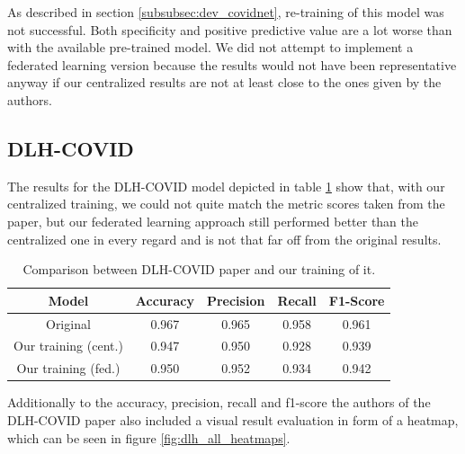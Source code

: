 As described in section \ref{subsubsec:dev_covidnet}, re-training of this model was not successful. Both specificity and positive predictive value are a lot worse than with the available pre-trained model. We did not attempt to implement a federated learning version because the results would not have been representative anyway if our centralized results are not at least close to the ones given by the authors.

\subsection{DLH-COVID}
The results for the DLH-COVID model depicted in table \ref{tab:results_dlh_covid} show that, with our centralized training, we could not quite match the metric scores taken from the paper, but our federated learning approach still performed better than the centralized one in every regard and is not that far off from the original results.

\begin{table}[htbp]
    \small
    \centering
    \caption{Comparison between DLH-COVID paper\cite{dlh_net} and our training of it.}
    \begin{tabular}{c|c|c|c|c}
        Model & Accuracy & Precision & Recall & F1-Score \\
        \hline
        Original & 0.967 & 0.965 & 0.958 & 0.961 \\
        Our training (cent.) & 0.947 & 0.950 & 0.928 & 0.939\\
        Our training (fed.) & 0.950 & 0.952 & 0.934 & 0.942\\
    \end{tabular}
    \label{tab:results_dlh_covid}
\end{table}

Additionally to the accuracy, precision, recall and f1-score the authors of the DLH-COVID paper also included a visual result evaluation in form of a heatmap, which can be seen in figure \ref{fig:dlh_all_heatmaps}.

